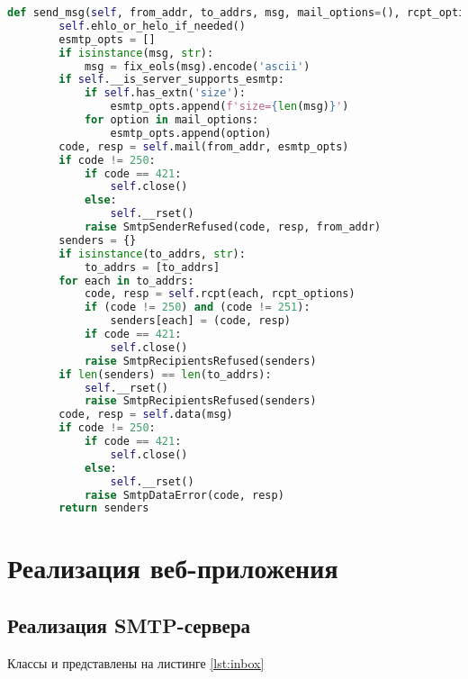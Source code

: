 \begin{lstlisting}[gobble=8, language=Python, caption={Метод отправки сообщения\label{lst:send_msg}}]
		def send_msg(self, from_addr, to_addrs, msg, mail_options=(), rcpt_options=()):
		self.ehlo_or_helo_if_needed()
		esmtp_opts = []
		if isinstance(msg, str):
			msg = fix_eols(msg).encode('ascii')
		if self.__is_server_supports_esmtp:
			if self.has_extn('size'):
				esmtp_opts.append(f'size={len(msg)}')
			for option in mail_options:
				esmtp_opts.append(option)
		code, resp = self.mail(from_addr, esmtp_opts)
		if code != 250:
			if code == 421:
				self.close()
			else:
				self.__rset()
			raise SmtpSenderRefused(code, resp, from_addr)
		senders = {}
		if isinstance(to_addrs, str):
			to_addrs = [to_addrs]
		for each in to_addrs:
			code, resp = self.rcpt(each, rcpt_options)
			if (code != 250) and (code != 251):
				senders[each] = (code, resp)
			if code == 421:
				self.close()
			raise SmtpRecipientsRefused(senders)
		if len(senders) == len(to_addrs):
			self.__rset()
			raise SmtpRecipientsRefused(senders)
		code, resp = self.data(msg)
		if code != 250:
			if code == 421:
				self.close()
			else:
				self.__rset()
			raise SmtpDataError(code, resp)
		return senders
\end{lstlisting}

\section{Реализация веб-приложения}

\subsection{Реализация SMTP-сервера}

Классы  и  представлены на листинге \ref{lst:inbox}

